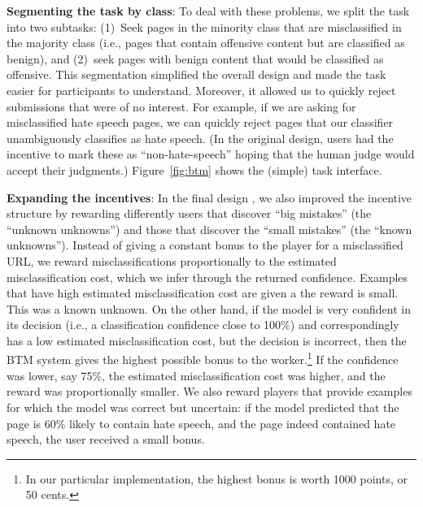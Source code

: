 \textbf{Segmenting the task by class}: To deal with these problems, we split the task into two subtasks: (1)~Seek pages in the minority class that are misclassified in the majority class (i.e., pages that contain offensive content but are classified as benign), and (2)~seek pages with benign content that would be classified as offensive. This segmentation simplified the overall design and made the task easier for participants to understand.  Moreover, it allowed us to quickly reject submissions that were of no interest.  For example, if we are asking for misclassified hate speech pages, we can quickly reject pages that our classifier unambiguously classifies as hate speech. (In the original design, users had the incentive to mark these as ``non-hate-speech'' hoping that the human judge would accept their judgments.) Figure~\ref{fig:btm} shows the (simple) task interface.

\textbf{Expanding the incentives}: In the final design , we also improved the incentive structure by rewarding differently users that discover ``big mistakes'' (the ``unknown unknowns'') and those that discover the ``small mistakes'' (the ``known unknowns''). Instead of giving a constant bonus to the player for a misclassified URL, we reward misclassifications proportionally to the estimated misclassification cost, which we infer through the returned confidence.  
Examples that have high estimated misclassification cost are given a the reward is small.  This was a known unknown.
On the other hand, if the model is very confident in its decision (i.e., a classification confidence close to 100\%) and correspondingly has a low estimated misclassification cost, but the decision is incorrect, then the BTM system gives the highest possible bonus to the worker.\footnote{In our particular implementation, the highest bonus is worth 1000 points, or 50 cents.} If the confidence was lower, say 75\%, the estimated misclassification cost was higher, and the reward was proportionally smaller. We also reward players that provide examples for which the model was correct but uncertain: if the model predicted that the page is 60\% likely to contain hate speech, and the page indeed contained hate speech, the user received a small bonus.
